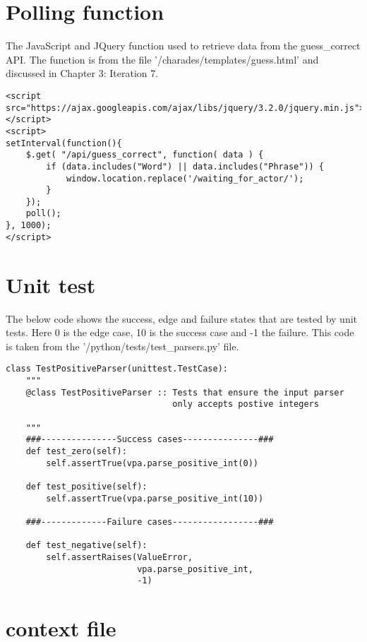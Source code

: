\newpage


\section{Polling function}

The JavaScript and JQuery function used to retrieve data from the guess\_correct API. The function is from the file '/charades/templates/guess.html' and discussed in Chapter 3: Iteration 7.

\begin{verbatim}
<script
src="https://ajax.googleapis.com/ajax/libs/jquery/3.2.0/jquery.min.js">
</script>
<script>
setInterval(function(){
    $.get( "/api/guess_correct", function( data ) {
        if (data.includes("Word") || data.includes("Phrase")) {
            window.location.replace('/waiting_for_actor/');
        }
    });
    poll();
}, 1000);
</script>
\end{verbatim}

\section{Unit test}

The below code shows the success, edge and failure states that are tested by unit tests. Here 0 is the edge case, 10 is the success case and -1 the failure.
This code is taken from the '/python/tests/test\_parsers.py' file.

\begin{verbatim}
class TestPositiveParser(unittest.TestCase):
    """
    @class TestPositiveParser :: Tests that ensure the input parser
    							 only accepts postive integers
    
    """
    ###---------------Success cases---------------###
    def test_zero(self):
        self.assertTrue(vpa.parse_positive_int(0))

    def test_positive(self):
        self.assertTrue(vpa.parse_positive_int(10))

    ###-------------Failure cases-----------------###

    def test_negative(self):
        self.assertRaises(ValueError,
                          vpa.parse_positive_int,
                          -1)

\end{verbatim}

\section{context file}

